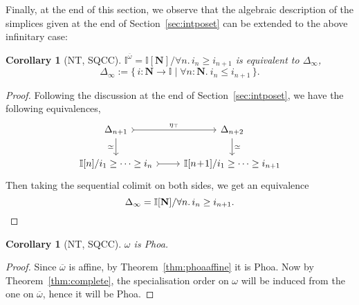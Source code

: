 \documentclass[12pt]{amsart}
\newtheorem{corollary}[theorem]{Corollary}
\theoremstyle{definition}
\newtheorem{definition}[theorem]{Definition}
\newcommand{\mb}[1]{\mathbf{#1}}
\newcommand{\mbb}[1]{\mathbb{#1}}
\newcommand{\I}{\mbb I}
\newcommand{\ov}[1]{\overline{#1}}
\newcommand{\scomp}[2]{\{\,#1\mid#2\,\}}
\newcommand{\N}{\mb N}
\newcommand{\cprt}{_{\top}}
\newcommand{\fa}[2]{\forall #1\!\colon\!\!#2.\ }
\begin{document}
Finally, at the end of this section, we observe that the algebraic description of the simplices given at the end of Section~\ref{sec:intposet} can be extended to the above infinitary case:

\begin{corollary}[NT, SQCC]
  $\I^{\ov\omega} = \I[\N]/\forall n.\, i_n \ge i_{n+1}$ is equivalent to $\Delta_\infty$, 
  \[ \Delta_\infty := \scomp{i : \N \to \I}{\fa n\N i_n \le i_{n+1}}. \]
\end{corollary}
\begin{proof}
  Following the discussion at the end of Section~\ref{sec:intposet}, we have the following equivalences,
  \[
    \begin{tikzcd}
      \Delta_{n+1} \ar[r, tail, "\eta\cprt"] \ar[d, "\simeq"'] & \Delta_{n+2}  \ar[d, "\simeq"] \\ 
      \I[n]/i_1 \ge \cdots \ge i_n \ar[r, tail] & \I[n\!+\!1]/i_1 \ge \cdots \ge i_{n+1} 
    \end{tikzcd}
  \]
  Then taking the sequential colimit on both sides, we get an equivalence
  \[ \Delta_{\infty} = \I[\N]/\forall n.\, i_n \ge i_{n+1}. \qedhere \]
\end{proof}

\begin{corollary}[NT, SQCC]
  $\omega$ is Phoa.
\end{corollary}
\begin{proof}
  Since $\ov\omega$ is affine, by Theorem~\ref{thm:phoaaffine} it is Phoa. Now by Theorem~\ref{thm:complete}, the specialisation order on $\omega$ will be induced from the one on $\ov\omega$, hence it will be Phoa.
\end{proof}




\end{document}
